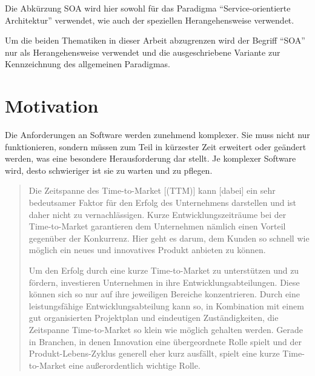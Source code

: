 Die Abkürzung SOA wird hier sowohl für das Paradigma "`Service-orientierte Architektur"' verwendet, wie auch der speziellen Herangehensweise verwendet.

Um die beiden Thematiken in dieser Arbeit abzugrenzen wird der Begriff "`SOA"' nur als Herangehensweise verwendet und die ausgeschriebene Variante zur Kennzeichnung des allgemeinen Paradigmas.



\section{Motivation}
\label{sec:motivation}
Die Anforderungen an Software werden zunehmend komplexer. Sie muss nicht nur funktionieren, sondern müssen zum Teil in kürzester Zeit erweitert oder geändert werden, was eine besondere Herausforderung dar stellt. Je komplexer Software wird, desto schwieriger ist sie zu warten und zu pflegen. 

\begin{quotation}
\frqq Die Zeitspanne des Time-to-Market [(TTM)] kann [dabei] ein sehr bedeutsamer Faktor für den Erfolg des Unternehmens darstellen und ist daher nicht zu vernachlässigen. Kurze Entwicklungszeiträume bei der Time-to-Market garantieren dem Unternehmen nämlich einen Vorteil gegenüber der Konkurrenz. Hier geht es darum, dem Kunden so schnell wie möglich ein neues und innovatives Produkt anbieten zu können.
    
Um den Erfolg durch eine kurze Time-to-Market zu unterstützen und zu fördern, investieren Unternehmen in ihre Entwicklungsabteilungen. Diese können sich so nur auf ihre jeweiligen Bereiche konzentrieren. Durch eine leistungsfähige Entwicklungsabteilung kann so, in Kombination mit einem gut organisierten Projektplan und eindeutigen Zuständigkeiten, die Zeitspanne Time-to-Market so klein wie möglich gehalten werden. Gerade in Branchen, in denen Innovation eine übergeordnete Rolle spielt und der Produkt-Lebens-Zyklus generell eher kurz ausfällt, spielt eine kurze Time-to-Market eine außerordentlich wichtige Rolle.\flqq \cite{ttm}
\end{quotation}

